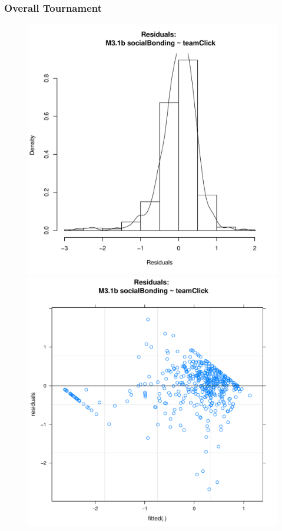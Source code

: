 {      \subsubsection{Overall Tournament\label{app8:MLM32a}}


        

        




            \begin{figure}[htbp]
              \includegraphics[scale =.4]{images/MLM31bHist.pdf}
              \includegraphics[scale =.4]{images/MLM31bScatter.pdf}

\end{figure}}
